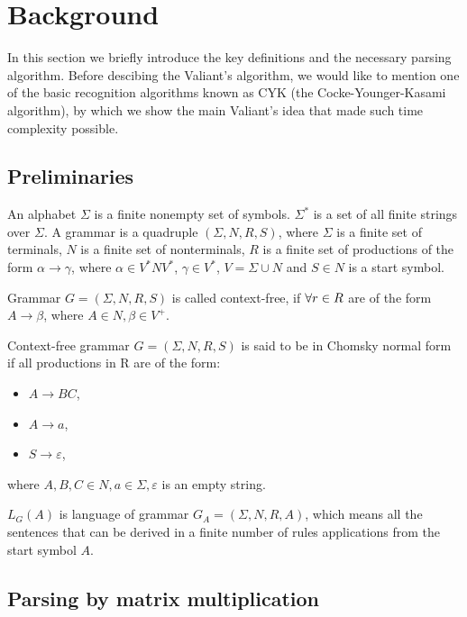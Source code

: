 \section{Background}

In this section we briefly introduce the key definitions and the necessary parsing algorithm.
Before descibing the Valiant's  algorithm, we would like to mention one of the basic recognition algorithms known as CYK (the Cocke-Younger-Kasami algorithm), by which we show the main Valiant's idea that made such time complexity possible.

\subsection{Preliminaries}

An alphabet $\Sigma$ is a finite nonempty set of symbols. $\Sigma^{*}$ is a set of all finite strings over $\Sigma$.
A grammar is a quadruple $(\Sigma, N, R, S)$, where $\Sigma$ is a finite set of terminals, $N$ is a finite set of nonterminals, $R$ is a finite set of productions of the form $\alpha \rightarrow \gamma$, where $\alpha \in V^{*}NV^{*}$, $\gamma \in V^{*}$, $V = \Sigma \cup N$ and $S \in N$ is a start symbol.

\begin{defn} Grammar $G = (\Sigma, N, R, S)$ is called context-free, if $\space\forall r \in R$ are of the form $A \rightarrow \beta$, where $A \in N, \beta \in V^{+}$.
\end{defn}

\begin{defn} Context-free grammar $G = (\Sigma, N, R, S)$ is said to be in Chomsky normal form if all productions in R are of the form:
\begin{itemize}
  \item $A \rightarrow BC$,
  \item $A \rightarrow a$,
  \item $S \rightarrow \varepsilon$,
\end{itemize}
where $A, B, C \in N, a \in \Sigma, \varepsilon$ is an empty string.
\end{defn}

\begin{defn} $L_{G}(A)$ is language of grammar $G_{A} = (\Sigma, N, R, A)$, which means all the sentences that can be derived in a finite number of rules applications from the start symbol $A$.
\end{defn}


\subsection{Parsing by matrix multiplication}

